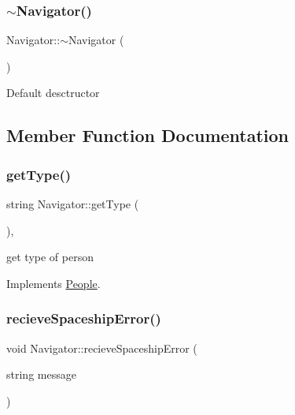 \subsubsection{\texorpdfstring{$\sim$\+Navigator()}{~Navigator()}}
{\footnotesize\ttfamily Navigator\+::$\sim$\+Navigator (\begin{DoxyParamCaption}{ }\end{DoxyParamCaption})\hspace{0.3cm}{\ttfamily [inline]}}

Default desctructor 

\subsection{Member Function Documentation}
\mbox{\label{classNavigator_a3b6314e429bc38e2cd330db7c187a7ae}} 
\subsubsection{\texorpdfstring{get\+Type()}{getType()}}
{\footnotesize\ttfamily string Navigator\+::get\+Type (\begin{DoxyParamCaption}{ }\end{DoxyParamCaption})\hspace{0.3cm}{\ttfamily [inline]}, {\ttfamily [virtual]}}

get type of person 

Implements \hyperlink{classPeople_af60dd882d60cddf63f9b95815ce551a8}{People}.

\mbox{\label{classNavigator_a7dc06965001f658cff3c5f0dcac39def}} 
\subsubsection{\texorpdfstring{recieve\+Spaceship\+Error()}{recieveSpaceshipError()}}
{\footnotesize\ttfamily void Navigator\+::recieve\+Spaceship\+Error (\begin{DoxyParamCaption}\item[{string}]{message }\end{DoxyParamCaption})\hspace{0.3cm}{\ttfamily [virtual]}}

